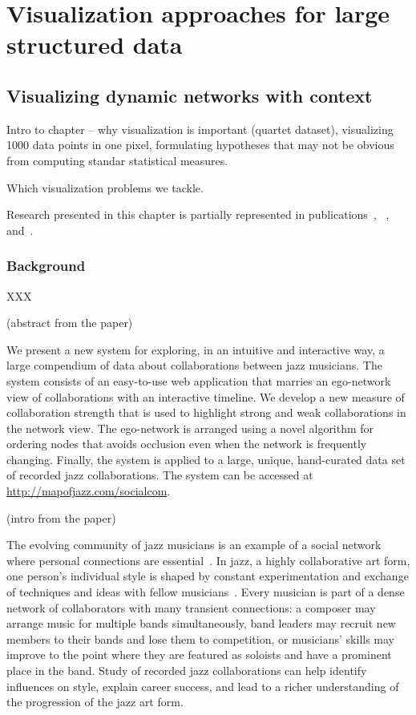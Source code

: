 \documentclass[12pt]{cmuthesis}
\begin{document}
\part{Visualization approaches for large structured data}


\chapter{Visualizing dynamic networks with context}

Intro to chapter -- why visualization is important (quartet dataset), visualizing 1000 data points in one pixel, formulating hypotheses that may not be obvious from computing standar statistical measures.

Which visualization problems we tackle.

Research presented in this chapter is partially represented in publications~\cite{Filippova2012moj},
~\cite{Coral}, and~\cite{SHARQwebsite}.

\section{Background}

  XXX

  (abstract from the paper)

  We present a new system for exploring, in an intuitive and interactive way, a
  large compendium of data about collaborations between jazz musicians.  The
  system consists of an easy-to-use web application that marries an ego-network
  view of collaborations with an interactive timeline.  We develop a new measure
  of collaboration strength that is used to highlight strong and weak
  collaborations in the network view. The ego-network is arranged using a novel
  algorithm for ordering nodes that avoids occlusion even when the network is
  frequently changing. Finally, the system is applied to a large, unique,
  hand-curated data set of recorded jazz collaborations.
  The system can be accessed at \url{http://mapofjazz.com/socialcom}.

  (intro from the paper)

  The evolving community of jazz musicians is an example of a social network where
  personal connections are essential~\cite{Pinheiro2009}. In jazz, a highly
  collaborative art form, one person's individual style is shaped by constant
  experimentation and exchange of techniques and ideas with fellow
  musicians~\cite{Berliner1994}.  Every musician is part of a dense network of
  collaborators with many transient connections: a composer may arrange music for
  multiple bands simultaneously, band leaders may recruit new members to their
  bands and lose them to competition, or musicians' skills may improve to the
  point where they are featured as soloists and have a prominent place in the
  band. Study of recorded jazz collaborations can help identify influences on
  style, explain career success, and lead to a richer understanding of the
  progression of the jazz art form.
\end{document}

